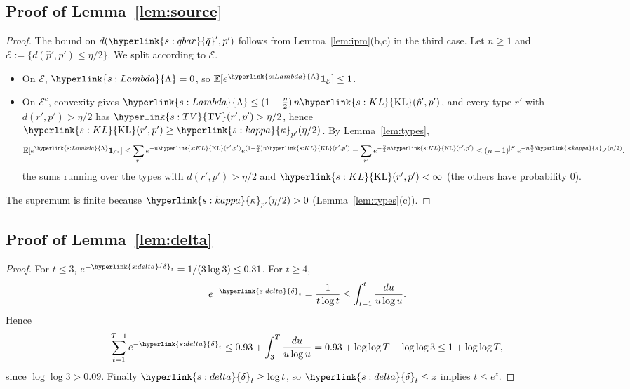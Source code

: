 \documentclass[11pt]{article}
\newcommand{\E}{\mathbb{E}}
\newcommand{\ind}{\mathbf{1}}
\newcommand{\cE}{\mathcal{E}}
\newcommand{\sy}[2]{{\hyperlink{#1}{#2}}}
\newcommand{\KL}{\sy{s:KL}{\mathrm{KL}}}
\newcommand{\TV}{\sy{s:TV}{\mathrm{TV}}}
\newcommand{\dl}{\sy{s:delta}{\delta}}
\newcommand{\qbar}{\sy{s:qbar}{\bar q}}
\newcommand{\Lam}{\sy{s:Lambda}{\Lambda}}
\newcommand{\kap}{\sy{s:kappa}{\kappa}}
\begin{document}
\subsection{Proof of Lemma~\ref{lem:source}}\label{sec:proof-lem-source}

\begin{proof}
The bound on $d(\qbar',p')$ follows from Lemma~\ref{lem:ipm}(b,c) in the third case. Let $n\ge1$
and $\cE:=\{d(\hat p',p')\le\eta/2\}$. We split according to $\cE$.
\begin{itemize}
\item On $\cE$, $\Lam=0$, so $\E[e^\Lam\ind_{\cE}]\le1$.
\item On $\cE^c$, convexity gives $\Lam\le(1-\frac\eta2)\,n\KL(\hat p',p')$, and every type $r'$
  with $d(r',p')>\eta/2$ has $\TV(r',p')>\eta/2$, hence $\KL(r',p')\ge\kap_{p'}(\eta/2)$. By
  Lemma~\ref{lem:types},
  \begin{equation*}
  \E[e^\Lam\ind_{\cE^c}]\le\sum_{r'}e^{-n\KL(r',p')}e^{(1-\frac\eta2)n\KL(r',p')}
  =\sum_{r'}e^{-\frac\eta2n\KL(r',p')}\le(n+1)^{|S|}e^{-n\frac\eta2\kap_{p'}(\eta/2)},
  \end{equation*}
  the sums running over the types with $d(r',p')>\eta/2$ and $\KL(r',p')<\infty$ (the others have
  probability $0$).
\end{itemize}
The supremum is finite because $\kap_{p'}(\eta/2)>0$ (Lemma~\ref{lem:types}(c)).
\end{proof}

\subsection{Proof of Lemma~\ref{lem:delta}}\label{sec:proof-lem-delta}

\begin{proof}
For $t\le3$, $e^{-\dl_t}=1/(3\log3)\le0.31$. For $t\ge4$,
\begin{equation*}
e^{-\dl_t}=\frac1{t\log t}\le\int_{t-1}^{t}\frac{du}{u\log u}.
\end{equation*}
Hence
\begin{equation*}
\sum_{t=1}^{T-1}e^{-\dl_t}\le0.93+\int_3^T\frac{du}{u\log u}=0.93+\log\log T-\log\log3\le1+\log\log T,
\end{equation*}
since $\log\log3>0.09$. Finally $\dl_t\ge\log t$, so $\dl_t\le z$ implies $t\le e^z$.
\end{proof}

\end{document}
